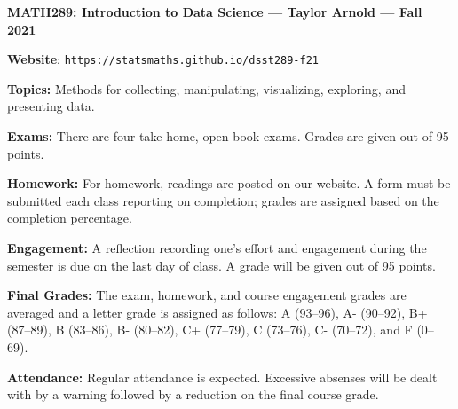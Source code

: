 \documentclass[11pt, a4paper]{article}
\begin{document}
\begin{center}
\textbf{MATH289: Introduction to Data Science --- Taylor Arnold --- Fall 2021}
\end{center}

\vspace{0.5cm}

\textbf{Website}: \texttt{https://statsmaths.github.io/dsst289-f21}

\bigskip

\textbf{Topics:}
Methods for collecting, manipulating, visualizing, exploring, and presenting
data.

\bigskip

\textbf{Exams:}
There are four take-home, open-book exams. Grades are given out of 95 points.

\bigskip

\textbf{Homework:}
For homework, readings are posted on our website. A form must be submitted each
class reporting on completion; grades are assigned based on the completion
percentage.

\bigskip

\textbf{Engagement:}
A reflection recording one's effort and engagement during the semester
is due on the last day of class. A grade will be given out of 95 points.

\bigskip

\textbf{Final Grades:}
The exam, homework, and course engagement grades are averaged and a letter grade
is assigned as follows:
             A (93--96), A- (90--92),
B+ (87--89), B (83--86), B- (80--82),
C+ (77--79), C (73--76), C- (70--72), and F (0--69).

\bigskip

\textbf{Attendance:}
Regular attendance is expected. Excessive absenses will be dealt with by a
warning followed by a reduction on the final course grade.

\vspace{0.25cm}

\begin{center}
\end{center}
\end{document}
